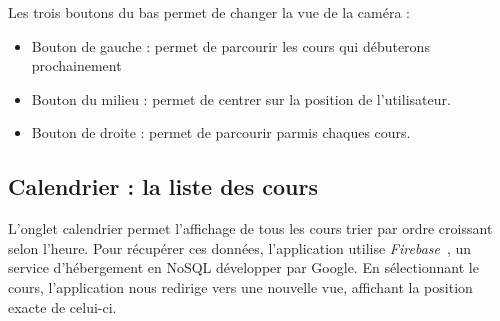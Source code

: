 \documentclass{article}
\begin{document}
Les trois boutons du bas permet de changer la vue de la caméra :\\

\begin{itemize}
    \item Bouton de gauche : permet de parcourir les cours qui débuterons prochainement

    \item Bouton du milieu : permet de centrer sur la position de l'utilisateur.

    \item Bouton de droite : permet de parcourir parmis chaques cours.
\end{itemize}



\newpage %



\subsection{Calendrier : la liste des cours}

L'onglet calendrier permet l'affichage de tous les cours trier par ordre croissant selon l'heure. Pour récupérer ces
données, l'application utilise \textit{Firebase}~\cite{firebaseDoc}, un service d'hébergement en NoSQL
développer par Google. En sélectionnant le cours, l'application nous redirige vers une nouvelle vue,
affichant la position exacte de celui-ci.

\vspace{10pt}   %
\end{document}
